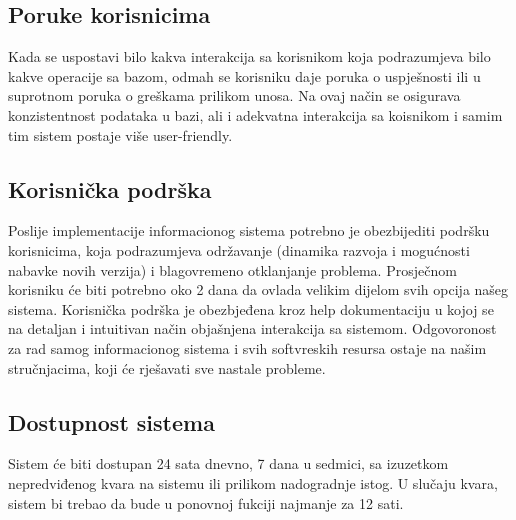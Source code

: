 \documentclass[12pt]{article}
\begin{document}
\subsection{Poruke korisnicima}
Kada se uspostavi bilo kakva interakcija sa korisnikom koja podrazumjeva bilo kakve operacije sa bazom, odmah se korisniku daje poruka o uspješnosti ili u suprotnom poruka o greškama prilikom unosa. Na ovaj način se osigurava konzistentnost podataka u bazi, ali i adekvatna interakcija sa koisnikom i samim tim sistem postaje više user-friendly.
 
\subsection{Korisnička podrška}
Poslije implementacije informacionog sistema potrebno je obezbijediti podršku korisnicima, koja podrazumjeva održavanje (dinamika razvoja i mogućnosti nabavke novih verzija) i blagovremeno otklanjanje problema. Prosječnom korisniku će biti potrebno oko 2 dana da ovlada velikim dijelom svih opcija našeg sistema.
Korisnička podrška je obezbjeđena kroz help dokumentaciju u kojoj se na detaljan i intuitivan način objašnjena interakcija sa sistemom. Odgovoronost za rad samog informacionog sistema i svih softvreskih resursa ostaje na našim stručnjacima, koji će rješavati sve nastale probleme.
 
\subsection{Dostupnost sistema}
Sistem će biti dostupan 24 sata dnevno, 7 dana u sedmici, sa izuzetkom nepredviđenog kvara na sistemu ili prilikom nadogradnje istog. U slučaju kvara, sistem bi trebao da bude u ponovnoj fukciji najmanje za 12 sati.
\end{document}
